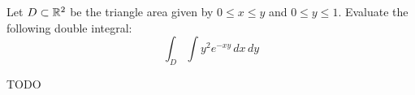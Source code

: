 \begin{exercise}
	Let $D \subset \mathbb{R}^2$ be the triangle area given by $0 \leq x \leq y$ and $0 \leq y \leq 1$. Evaluate the following double integral:
	$$
		\int_D \int y^2 e^{-xy} \, dx \, dy
	$$
\end{exercise}

\begin{solution}
	TODO
\end{solution}
